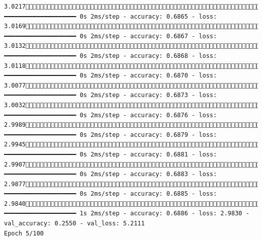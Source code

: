 \documentclass[
  letterpaper,
  DIV=11,
  numbers=noendperiod]{scrartcl}
\begin{document}
\begin{verbatim}
3.0217571/858 ━━━━━━━━━━━━━━━━━━━━ 0s 2ms/step - accuracy: 0.6865 - loss: 3.0169600/858 ━━━━━━━━━━━━━━━━━━━━ 0s 2ms/step - accuracy: 0.6867 - loss: 3.0132612/858 ━━━━━━━━━━━━━━━━━━━━ 0s 2ms/step - accuracy: 0.6868 - loss: 3.0118646/858 ━━━━━━━━━━━━━━━━━━━━ 0s 2ms/step - accuracy: 0.6870 - loss: 3.0077683/858 ━━━━━━━━━━━━━━━━━━━━ 0s 2ms/step - accuracy: 0.6873 - loss: 3.0032720/858 ━━━━━━━━━━━━━━━━━━━━ 0s 2ms/step - accuracy: 0.6876 - loss: 2.9989758/858 ━━━━━━━━━━━━━━━━━━━━ 0s 2ms/step - accuracy: 0.6879 - loss: 2.9945792/858 ━━━━━━━━━━━━━━━━━━━━ 0s 2ms/step - accuracy: 0.6881 - loss: 2.9907819/858 ━━━━━━━━━━━━━━━━━━━━ 0s 2ms/step - accuracy: 0.6883 - loss: 2.9877851/858 ━━━━━━━━━━━━━━━━━━━━ 0s 2ms/step - accuracy: 0.6885 - loss: 2.9840858/858 ━━━━━━━━━━━━━━━━━━━━ 1s 2ms/step - accuracy: 0.6886 - loss: 2.9830 - val_accuracy: 0.2550 - val_loss: 5.2111
Epoch 5/100

\end{verbatim}
\end{document}

